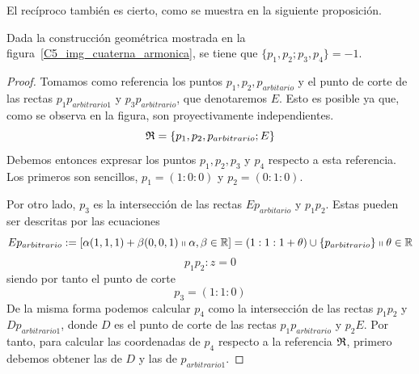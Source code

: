 El recíproco también es cierto, como se muestra en la siguiente proposición.
\begin{prop}
	Dada la construcción geométrica mostrada en la figura~\ref{C5_img_cuaterna_armonica}, se tiene que $\{p_1,p_2;p_3,p_4\}=-1$.
	
\end{prop}
\begin{proof}
	Tomamos como referencia los puntos $p_1,p_2,p_{arbitario}$ y el punto de corte de las rectas $p_1p_{arbitrario1}$ y $p_3p_{arbitrario}$, que denotaremos $E$. Esto es posible ya que, como se observa en la figura, son proyectivamente independientes.
	\[\mathfrak{R}=\{p_1,p_2,p_{arbitrario};E\}\]
	Debemos entonces expresar los puntos $p_1,p_2,p_3$ y $p_4$ respecto a esta referencia. Los primeros son sencillos, $p_1=(1:0:0)$ y $p_2=(0:1:0)$. 
	
	Por otro lado, $p_3$ es la intersección de las rectas $Ep_{arbitario}$ y $p_1p_2$. Estas pueden ser descritas por las ecuaciones
	\begin{equation*}
		Ep_{arbitrario}:=\left [ \alpha(1,1,1)+\beta(0,0,1)\shortparallel \alpha,\beta\in \mathbb{R} \right ]=(1:1:1+\theta)\cup\{p_{arbitrario}\}\shortparallel\theta\in\mathbb{R}
	\end{equation*}
	\begin{equation*}
		p_1p_2:z=0
	\end{equation*}
	siendo por tanto el punto de corte 
	\[p_3=(1:1:0)\]
	De la misma forma podemos calcular $p_4$ como la intersección de las rectas $p_1p_2$ y $Dp_{arbitrario1}$, donde $D$ es el punto de corte de las rectas $p_1p_{arbitrario}$ y $p_2E$. Por tanto, para calcular las coordenadas de $p_4$ respecto a la referencia $\mathfrak{R}$, primero debemos obtener las de $D$ y las de $p_{arbitrario1}$.
	

\end{proof}
